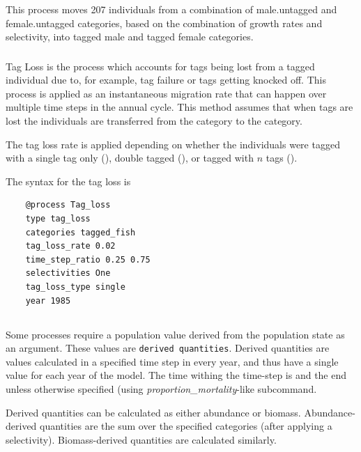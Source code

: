 This process moves 207 individuals from a combination of male.untagged and female.untagged categories, based on the combination of growth rates and selectivity, into tagged male and tagged female categories.

\subsubsection{}

Tag Loss is the process which accounts for tags being lost from a tagged individual due to, for example, tag failure or tags getting knocked off. This process is applied as an instantaneous migration rate that can happen over multiple time steps in the annual cycle. This method assumes that when tags are lost the individuals are transferred from the  category to the  category.

The tag loss rate is applied depending on whether the individuals were tagged with a single tag only (), double tagged (), or tagged with $n$ tags ().

The syntax for the tag loss is

{\small{\begin{verbatim}
	@process Tag_loss
	type tag_loss
	categories tagged_fish
	tag_loss_rate 0.02
	time_step_ratio 0.25 0.75
	selectivities One
	tag_loss_type single
	year 1985
\end{verbatim}}}

\subsection{\label{sec:derived-quantities}}

Some processes require a population value derived from the population state as an argument. These values are \texttt{derived quantities}. Derived quantities are values calculated in a specified time step in every year, and thus have a single value for each year of the model. The time withing the time-step is and the end unless otherwise specified (using \textit{proportion\_mortality}-like subcommand.

Derived quantities can be calculated as either abundance or biomass. Abundance-derived quantities are the sum over the specified categories (after applying a selectivity). Biomass-derived quantities are calculated similarly. 

